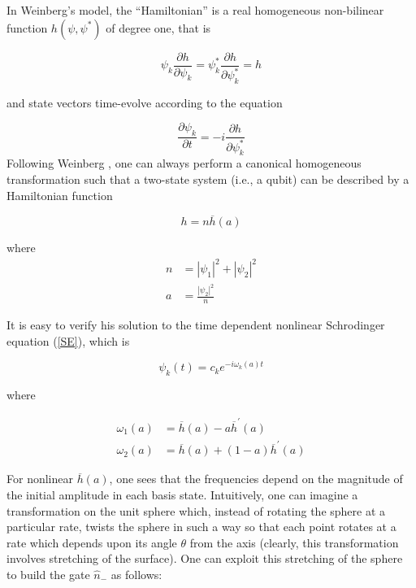 \documentclass[12pt]{article}
\begin{document}
In Weinberg's model, the ``Hamiltonian'' is a real homogeneous non-bilinear
function $h(\psi,\psi^{*})$ of degree one, that is \cite{Weinberg 2}%

\begin{equation}
\psi_{k}\frac{\partial h}{\partial\psi_{k}}=\psi_{k}^{*}\frac{\partial
h}{\partial\psi_{k}^{*}}=h
\end{equation}

and state vectors time-evolve according to the equation%

\begin{equation}
\frac{\partial\psi_{k}}{\partial t}=-i\frac{\partial h}{\partial\psi_{k}^{*}}
\label{SE}%
\end{equation}
Following Weinberg \cite{Weinberg 2}, one can always perform a canonical
homogeneous transformation such that a two-state system (i.e., a qubit) can be
described by a Hamiltonian function%

\begin{equation}
h=n\overline{h}(a)
\end{equation}

where
\begin{align}
n  &  =|\psi_{1}|^{2}+|\psi_{2}|^{2}\\
a  &  =\frac{|\psi_{2}|^{2}}{n}%
\end{align}

It is easy to verify his solution to the time dependent nonlinear Schrodinger
equation (\ref{SE}), which is%

\begin{equation}
\psi_{k}(t)=c_{k}e^{-i\omega_{k}(a)t}%
\end{equation}

where%

\begin{align}
\omega_{1}(a)  &  =\overline{h}(a)-a\overline{h}^{\prime}(a)\\
\omega_{2}(a)  &  =\overline{h}(a)+(1-a)\overline{h}^{\prime}(a)
\end{align}

For nonlinear $\overline{h}(a)$, one sees that the frequencies depend on the
magnitude of the initial amplitude in each basis state. Intuitively, one can
imagine a transformation on the unit sphere which, instead of rotating the
sphere at a particular rate, twists the sphere in such a way so that each
point rotates at a rate which depends upon its angle $\theta$ from the axis
(clearly, this transformation involves stretching of the surface). One can
exploit this stretching of the sphere to build the gate $\widehat{n}_{-}$ as follows:
\end{document}
